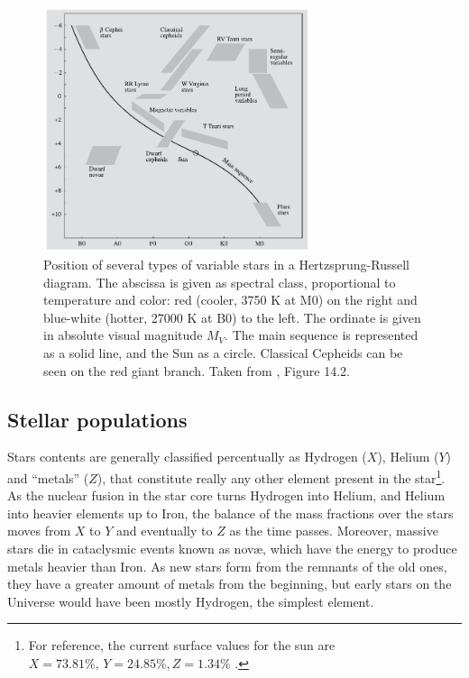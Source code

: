	
	\begin{figure}
		\centering
		\includegraphics[width=0.7\textwidth]{img/Karttunen_13.2.pdf}
		\caption[Variable stars in the HR diagram]{
			Position of several types of variable stars in a Hertzsprung-Russell diagram.
			The abscissa is given as spectral class, proportional to temperature and color: 
			red (cooler, 3750 K at M0) on the right and blue-white (hotter, 27000 K at B0) to the left. 
			The ordinate is given in absolute visual magnitude $M_V$.
			The main sequence is represented as a solid line, and the Sun as a circle.
			Classical Cepheids can be seen on the red giant branch. 
			Taken from \cite{Karttunen2017}, Figure 14.2.
		}
		\label{fig:HR-diagram-karttunen}
	\end{figure}
	
	\subsection{Stellar populations}
	
	Stars contents are generally classified percentually as Hydrogen ($X$), Helium ($Y$) and \enquote{metals} ($Z$), 
	that constitute really any other element present in the star\footnote{
		For reference, the current surface values for the sun are $X=73.81\%,\,Y=24.85\%,Z=1.34\%$ \citep{Asplund2009}.
	}.
	As the nuclear fusion in the star core turns Hydrogen into Helium, and Helium into heavier elements up to Iron, 
	the balance of the mass fractions over the stars moves from $X$ to $Y$ and eventually to $Z$ as the time passes.
	Moreover, massive stars die in cataclysmic events known as novæ, which have the energy to produce metals heavier than Iron.
	As new stars form from the remnants of the old ones, they have a greater amount of metals from the beginning, 
	but early stars on the Universe would have been mostly Hydrogen, the simplest element.
	
